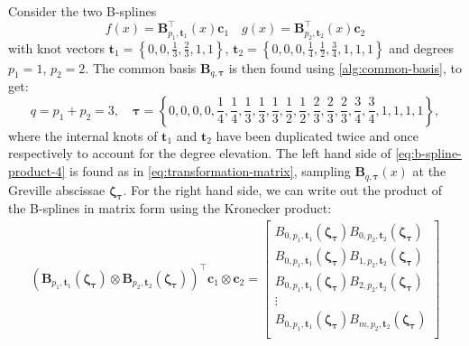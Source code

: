 \begin{example}
    \label{ex:linear-spline-multiplication}
    Consider the two B-splines
    \begin{equation*}
        f(x) = \mathbf{B}_{p_1, \mathbf t_1}^\top(x) \mathbf{c}_1
        \quad g(x) = \mathbf{B}_{p_2, \mathbf t_2}^\top(x) \mathbf{c}_2
    \end{equation*}
    with knot vectors $\mathbf t_1 = \left\{0, 0, \frac{1}{3}, \frac{2}{3}, 1, 1\right\}$,  $\mathbf t_2 = \left\{0, 0, 0, \frac{1}{4}, \frac{1}{2}, \frac{3}{4}, 1, 1, 1\right\}$ and degrees  $p_1 = 1$, $p_2 = 2$. 
    The common basis $\mathbf{B}_{q,\boldsymbol{\tau}}$ is then found using \cref{alg:common-basis}, to get:
    \begin{equation*}
        q = p_1 + p_2 = 3,
        \quad
        \boldsymbol{\tau} = \left\{0, 0, 0, 0, \frac{1}{4}, \frac{1}{4}, \frac{1}{3}, \frac{1}{3}, \frac{1}{3}, \frac{1}{2}, \frac{1}{2}, \frac{2}{3}, \frac{2}{3}, \frac{2}{3}, \frac{3}{4}, \frac{3}{4}, 1, 1, 1, 1\right\},
    \end{equation*}
    where the internal knots of $\mathbf t_1$ and $\mathbf t_2$ have been duplicated twice and once respectively to account for the degree elevation. 
    The left hand side of \cref{eq:b-spline-product-4} is found as in \cref{eq:transformation-matrix}, sampling $\mathbf B_{q, \boldsymbol{\tau}}(x)$ at the Greville abscissae $\boldsymbol{\zeta_\tau}$.
    For the right hand side, we can write out the product of the B-splines in matrix form using the Kronecker product:
    \begin{equation*}
        \begin{aligned}
            (\mathbf B_{p_1, \mathbf{t}_1}(\boldsymbol{\zeta_\tau}) \otimes \mathbf B_{p_2, \mathbf{t}_2}(\boldsymbol{\zeta_\tau}))^\top \mathbf{c}_1 \otimes \mathbf{c}_2 = \begin{bmatrix}
                B_{0, p_1, \mathbf{t}_1}(\boldsymbol{\zeta_\tau}) B_{0, p_2, \mathbf{t}_2}(\boldsymbol{\zeta_\tau}) \\
                B_{0, p_1, \mathbf{t}_1}(\boldsymbol{\zeta_\tau}) B_{1, p_2, \mathbf{t}_2}(\boldsymbol{\zeta_\tau}) \\
                B_{0, p_1, \mathbf{t}_1}(\boldsymbol{\zeta_\tau}) B_{2, p_2, \mathbf{t}_2}(\boldsymbol{\zeta_\tau}) \\
                \vdots \\
                B_{0, p_1, \mathbf{t}_1}(\boldsymbol{\zeta_\tau}) B_{m, p_2, \mathbf{t}_2}(\boldsymbol{\zeta_\tau}) \\

\end{bmatrix}
\end{aligned}
\end{equation*}
\end{example}
